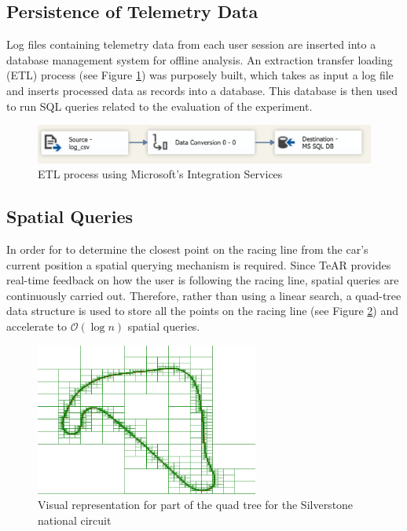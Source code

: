 \subsection{Persistence of Telemetry Data}
Log files containing telemetry data from each user session are inserted into a database management system for offline analysis. An extraction transfer loading (ETL\cite{kimball2004data}) process (see Figure \ref{fig:ssis}) was purposely built, which takes as input a log file and inserts processed data as records into a database. This database is then used to run SQL queries related to the evaluation of the experiment.

\begin{figure}[!htb]
	\centering
	\includegraphics[width=\textwidth]{diagrams/ssis.png}
	\caption{ETL process using Microsoft's Integration Services}
	\label{fig:ssis}
\end{figure}

\subsection{Spatial Queries}
\label{sec:imp-SpatialQuerying}
In order for \methodname to determine the closest point on the racing line from the car's current position a spatial querying mechanism is required. Since TeAR provides real-time feedback on how the user is following the racing line, spatial queries are continuously carried out. Therefore, rather than using a linear search, a quad-tree data structure \cite{finkel1974quad} is used to store all the points on the racing line (see Figure \ref{fig:QuadTree}) and accelerate to $\mathcal{O}(\log{n})$ spatial queries. 

\begin{figure}[!htb]
	\centering
	\includegraphics[height=5cm]{images/QuadTree}
	\caption{Visual representation for part of the quad tree for the Silverstone national circuit}
	\label{fig:QuadTree}
\end{figure}


